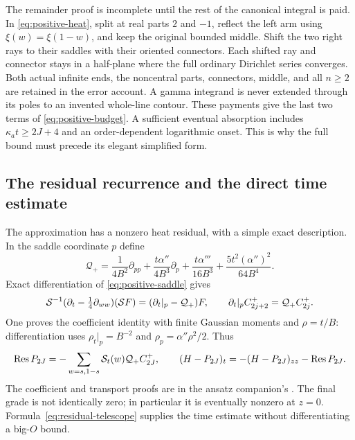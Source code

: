The remainder proof is incomplete until the rest of the canonical
integral is paid. In \eqref{eq:positive-heat}, split at real parts
$2$ and $-1$, reflect the left arm using $\xi(w)=\xi(1-w)$, and
keep the original bounded middle. Shift the two right rays to their
saddles with their oriented connectors. Each shifted ray and connector
stays in a half-plane where the full ordinary Dirichlet series
converges. Both actual infinite ends, the noncentral parts, connectors,
middle, and all $n\ge2$ are retained in the error account. A gamma
integrand is never extended through its poles to an invented whole-line
contour. These payments give the last two terms of
\eqref{eq:positive-budget}. A sufficient eventual absorption includes
$\kappa_a t\ge2J+4$ and an order-dependent logarithmic onset.
This is why the full bound must precede its elegant simplified form.

\subsection{The residual recurrence and the direct time estimate}
The approximation has a nonzero heat residual, with a simple exact
description. In the saddle coordinate $p$ define
\begin{equation}
 \mathcal Q_+=\frac1{4B^2}\partial_{pp}
 +\frac{t\alpha''}{4B^3}\partial_p
 +\frac{t\alpha'''}{16B^3}
 +\frac{5t^2(\alpha'')^2}{64B^4}.
 \label{eq:positive-operator}
\end{equation}
Exact differentiation of \eqref{eq:positive-saddle} gives
\begin{equation}
 \mathcal S^{-1}(\partial_t-\tfrac14\partial_{ww})(\mathcal S F)
             =(\partial_t|_p-\mathcal Q_+)F,
 \qquad
 \partial_t|_p C_{2j+2}^+=\mathcal Q_+C_{2j}^+.
 \label{eq:positive-transport}
\end{equation}
One proves the coefficient identity with finite Gaussian moments and
$\rho=t/B$: differentiation uses $\rho_t|_p=B^{-2}$ and
$\rho_p=\alpha''\rho^2/2$. Thus
\begin{equation}
 \operatorname{Res} P_{2J}=-\sum_{w=s,1-s}\mathcal S_t(w)\mathcal Q_+C_{2J}^+,
 \qquad
 (H-P_{2J})_t=-(H-P_{2J})_{zz}-\operatorname{Res} P_{2J}.
 \label{eq:residual-telescope}
\end{equation}
The coefficient and transport proofs are in the ansatz companion's
.
The final grade is not identically zero; in particular it is eventually
nonzero at $z=0$. Formula~\eqref{eq:residual-telescope} supplies the
time estimate without differentiating a big-$O$ bound.

